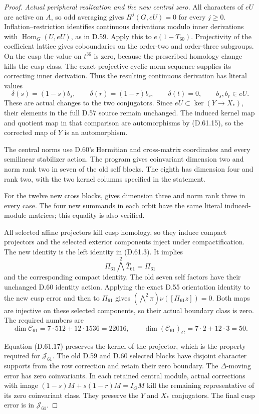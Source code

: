 \begin{proof}
\emph{Actual peripheral realization and the new central zero.}
All characters of \(eU\) are active
on \(A\), so odd averaging gives
\(H^j(G,eU)=0\) for every \(j\geq0\).
Inflation--restriction identifies
continuous derivations modulo inner
derivations with
\(\operatorname{Hom}_G(U,eU)\), as
in D.59. Apply this to
\(e(1-T_{60})\). Projectivity of
the coefficient lattice gives
coboundaries on the order-two and
order-three subgroups. On the cusp
the value on \(t^{36}\) is zero,
because the prescribed homology
change kills the cusp class.
The exact projective cyclic norm
sequence supplies its correcting
inner derivation. Thus the resulting
continuous derivation has literal
values
\[
 \delta(s)=(1-s)b_s,\qquad
 \delta(r)=(1-r)b_r,\qquad
 \delta(t)=0,\qquad b_s,b_r\in eU.
 \tag{D.61.16}
\]
These are actual changes to the
two conjugators. Since
\(eU\subset\ker(Y\to X_*)\),
their elements in the full D.57
source remain unchanged. The
induced kernel map and quotient
map in that comparison are
automorphisms by (D.61.15), so
the corrected map of \(Y\)
is an automorphism.

The central norms use D.60's
Hermitian and cross-matrix coordinates
and every semilinear stabilizer action.
The program 
gives coinvariant dimension two
and norm rank two in seven of
the old self blocks. The eighth
has dimension four and rank two,
with the two kernel columns
specified in the statement.

For the twelve new cross blocks,
gives dimension three and norm
rank three in every case.
The four new summands in each
orbit have the same literal
induced-module matrices; this
equality is also verified.

All selected affine projectors
kill cusp homology, so they
induce compact projectors and
the selected exterior components
inject under compactification.
The new identity is the left
identity in (D.61.3). It implies
\[
              \Pi_{61}\bigwedge^2\bar T_{61}=\Pi_{61}
 \tag{D.61.17}
\]
and the corresponding compact
identity. The old seven self
factors have their unchanged
D.60 identity action. Applying
the exact D.55 orientation
identity to the new cusp error
and then to \(\Pi_{61}\) gives
\((\bigwedge^2\pi)\nu([\Pi_{61}z])=0\).
Both maps are injective on
these selected components, so
their actual boundary class
is zero. The required numbers
are
\[
 \dim\mathcal C_{61}=7\cdot512+12\cdot1536=22016,
 \qquad \dim(\mathcal C_{61})_G=7\cdot2+12\cdot3=50.
 \tag{D.61.18}
\]

Equation (D.61.17) preserves the
kernel of the projector, which
is the property required for
\(\mathcal J_{61}\). The old
D.59 and D.60 selected blocks
have disjoint character supports
from the row correction and
retain their zero boundary.
The \(\Delta\)-moving error
has zero coinvariants. In each
retained central module, actual
corrections with image
\((1-s)M+s(1-r)M=I_GM\)
kill the remaining representative
of its zero coinvariant class.
They preserve the \(Y\) and
\(X_*\) conjugators. The final
cusp error is in
\(\mathcal J_{61}\).


\end{proof}
